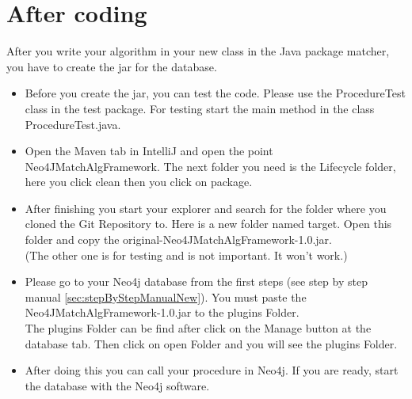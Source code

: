 \section{After coding}\label{sec:afterProgrammingNew}
After you write your algorithm in your new class in the Java package matcher, you have to create the \glqq jar\grqq{} for the database.
\begin{itemize}
	\item Before you create the jar, you can test the code. Please use the \glqq ProcedureTest\grqq{} class in the test package. For testing start the main method in the class \glqq ProcedureTest.java\grqq{}.
	\item Open the Maven tab in \glqq IntelliJ \grqq{} and open the point \glqq Neo4JMatchAlgFramework\grqq{}. The next folder you need is the \glqq Lifecycle\grqq{} folder, here you click \glqq clean\grqq{} then you click on \glqq package\grqq{}.
	\item After finishing you start your explorer and search for the folder where you cloned the \glqq Git Repository\grqq{} to. Here is a new folder named target. Open this folder and copy the \glqq original-Neo4JMatchAlgFramework-1.0.jar\grqq{}. \\
	(The other one is for testing and is not important. It won't work.)
	\item Please go to your Neo4j database from the first steps (see step by step manual \ref{sec:stepByStepManualNew}).
	You must paste the \glqq Neo4JMatchAlgFramework-1.0.jar\grqq{} to the \glqq plugins\grqq{} Folder. 
	\\The \glqq plugins\grqq{} Folder can be find after click on the \glqq Manage\grqq{} button at the database tab. Then click on open Folder and you will see the \glqq plugins\grqq{} Folder. 
	\item After doing this you can call your procedure in Neo4j. If you are ready, start the database with the Neo4j software.
\end{itemize}

